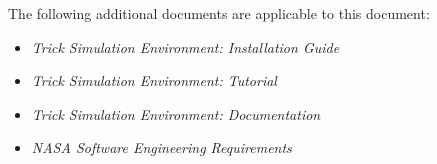 The following additional documents are applicable to this document:

\begin{itemize}
\item{\em Trick Simulation Environment: Installation Guide}
\cite{Trick:Install}

\item{\em Trick Simulation Environment: Tutorial}
\cite{Trick:Tutorial}

\item{\em Trick Simulation Environment: Documentation}
\cite{Trick:Documentation}

\item{\em NASA Software Engineering Requirements}
\cite{NASA:SWE}

\end{itemize}
